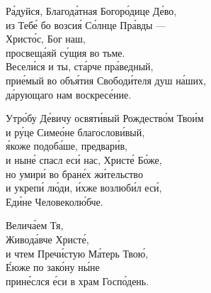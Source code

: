 \documentclass{article}
\begin{document}
%
Ра́дуйся, Благода́тная Богоро́дице Де́во, \\
из Тебе́ бо возсия́ Со́лнце Пра́вды --- \\
      \cont Христо́с, Бог наш, \\
просвеща́яй су́щия во тьме. \\
Весели́ся и ты, ста́рче пра́ведный,\\
прие́мый во объя́тия Свободи́теля душ на́ших,\\
да́рующаго нам воскресе́ние.

Утро́бу Де́вичу освяти́вый Рождество́м Твои́м \\
и ру́це Симео́не благослови́вый, \\
я́коже подоба́ше, предвари́в, \\
и ныне́ спасл еси́ нас, Христе́ Бо́же,\\
но умири́ во бране́х жи́тельство \\
и укрепи́ лю́ди, и́хже возлюби́л еси́, \\
    \cont Еди́не Человеколю́бче.

Велича́ем Тя, \\
Живода́вче Христе́, \\
и чтем Пречи́стую Ма́терь Твою́, \\
Е́юже по зако́ну ны́не \\
прине́слся е́си в храм Госпо́день.
\end{document}
